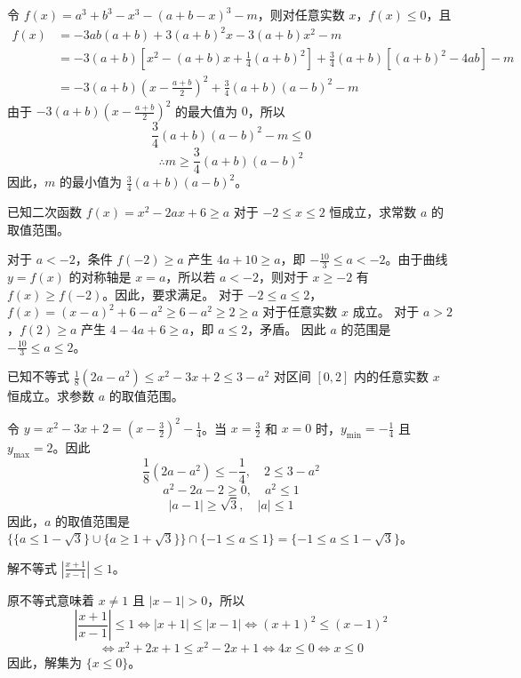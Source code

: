 \begin{questions}
\begin{solution}
令 $f(x) = a^3+b^3-x^3 - (a+b-x)^3 - m$，则对任意实数 $x$，$f(x) \le 0$，且
\begin{align*}
f(x) &= -3ab(a+b) + 3(a+b)^2x - 3(a+b)x^2 - m \\
&= -3(a+b) \left[ x^2 - (a+b)x + \frac{1}{4}(a+b)^2 \right] + \frac{3}{4}(a+b) \left[ (a+b)^2 - 4ab \right] - m \\
&= -3(a+b) \left( x - \frac{a+b}{2} \right)^2 + \frac{3}{4}(a+b)(a-b)^2 - m
\end{align*}
由于 $-3(a+b) \left( x - \frac{a+b}{2} \right)^2$ 的最大值为 $0$，所以
\[
\frac{3}{4}(a+b)(a-b)^2 - m \le 0
\]
\[
\therefore m \ge \frac{3}{4}(a+b)(a-b)^2
\]
因此，$m$ 的最小值为 $\frac{3}{4}(a+b)(a-b)^2$。
\end{solution}

\question 已知二次函数 $f(x)=x^2-2ax+6 \ge a$ 对于 $-2 \le x \le 2$ 恒成立，求常数 $a$ 的取值范围。

\begin{solution}
对于 $a < -2$，条件 $f(-2) \ge a$ 产生 $4a+10 \ge a$，即 $-\frac{10}{3} \le a < -2$。由于曲线 $y=f(x)$ 的对称轴是 $x=a$，所以若 $a < -2$，则对于 $x \ge -2$ 有 $f(x) \ge f(-2)$。因此，要求满足。
对于 $-2 \le a \le 2$，$f(x) = (x-a)^2+6-a^2 \ge 6-a^2 \ge 2 \ge a$ 对于任意实数 $x$ 成立。
对于 $a > 2$，$f(2) \ge a$ 产生 $4-4a+6 \ge a$，即 $a \le 2$，矛盾。
因此 $a$ 的范围是 $-\frac{10}{3} \le a \le 2$。
\end{solution}

\question 已知不等式 $\frac{1}{8}(2a-a^2) \le x^2-3x+2 \le 3-a^2$ 对区间 $[0, 2]$ 内的任意实数 $x$ 恒成立。求参数 $a$ 的取值范围。

\begin{solution}
令 $y=x^2-3x+2 = (x-\frac{3}{2})^2-\frac{1}{4}$。当 $x=\frac{3}{2}$ 和 $x=0$ 时，$y_{\min} = -\frac{1}{4}$ 且 $y_{\max} = 2$。因此
\[
\frac{1}{8}(2a-a^2) \le -\frac{1}{4}, \quad 2 \le 3-a^2
\]
\[
a^2-2a-2 \ge 0, \quad a^2 \le 1
\]
\[
|a-1| \ge \sqrt{3}, \quad |a| \le 1
\]
因此，$a$ 的取值范围是 $\{ \{a \le 1-\sqrt{3}\} \cup \{a \ge 1+\sqrt{3}\} \} \cap \{-1 \le a \le 1\} = \{-1 \le a \le 1-\sqrt{3}\}$。
\end{solution}

\question 解不等式 $\left| \frac{x+1}{x-1} \right| \le 1$。

\begin{solution}
原不等式意味着 $x \neq 1$ 且 $|x-1| > 0$，所以
\[
\left| \frac{x+1}{x-1} \right| \le 1 \iff |x+1| \le |x-1| \iff (x+1)^2 \le (x-1)^2
\]
\[
\iff x^2+2x+1 \le x^2-2x+1 \iff 4x \le 0 \iff x \le 0
\]
因此，解集为 $\{x \le 0\}$。
\end{solution}


\end{questions}

